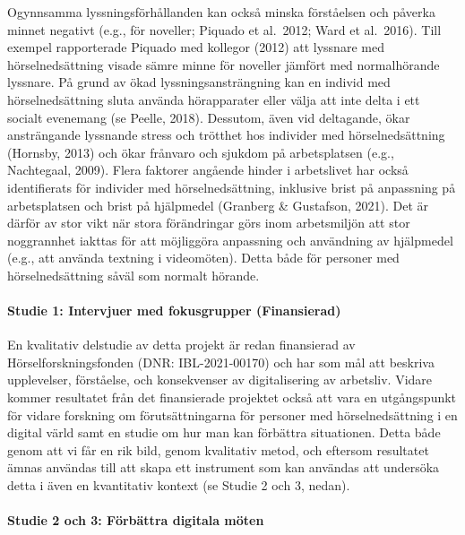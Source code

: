 \documentclass[]{article}
\begin{document}
Ogynnsamma lyssningsförhållanden kan också minska förståelsen och
påverka minnet negativt (e.g., för noveller; Piquado et al.~2012; Ward
et al.~2016). Till exempel rapporterade Piquado med kollegor (2012) att
lyssnare med hörselnedsättning visade sämre minne för noveller jämfört
med normalhörande lyssnare. På grund av ökad lyssningsansträngning kan
en individ med hörselnedsättning sluta använda hörapparater eller välja
att inte delta i ett socialt evenemang (se Peelle, 2018). Dessutom, även
vid deltagande, ökar ansträngande lyssnande stress och trötthet hos
individer med hörselnedsättning (Hornsby, 2013) och ökar frånvaro och
sjukdom på arbetsplatsen (e.g., Nachtegaal, 2009). Flera faktorer
angående hinder i arbetslivet har också identifierats för individer med
hörselnedsättning, inklusive brist på anpassning på arbetsplatsen och
brist på hjälpmedel (Granberg \& Gustafson, 2021). Det är därför av stor
vikt när stora förändringar görs inom arbetsmiljön att stor noggrannhet
iakttas för att möjliggöra anpassning och användning av hjälpmedel
(e.g., att använda textning i videomöten). Detta både för personer med
hörselnedsättning såväl som normalt hörande.

\hypertarget{studie-1-intervjuer-med-fokusgrupper-finansierad}{%
\paragraph{Studie 1: Intervjuer med fokusgrupper
(Finansierad)}\label{studie-1-intervjuer-med-fokusgrupper-finansierad}}

En kvalitativ delstudie av detta projekt är redan finansierad av
Hörselforskningsfonden (DNR: IBL-2021-00170) och har som mål att
beskriva upplevelser, förståelse, och konsekvenser av digitalisering av
arbetsliv. Vidare kommer resultatet från det finansierade projektet
också att vara en utgångspunkt för vidare forskning om förutsättningarna
för personer med hörselnedsättning i en digital värld samt en studie om
hur man kan förbättra situationen. Detta både genom att vi får en rik
bild, genom kvalitativ metod, och eftersom resultatet ämnas användas
till att skapa ett instrument som kan användas att undersöka detta i
även en kvantitativ kontext (se Studie 2 och 3, nedan).

\hypertarget{studie-2-och-3-fuxf6rbuxe4ttra-digitala-muxf6ten}{%
\paragraph{Studie 2 och 3: Förbättra digitala
möten}\label{studie-2-och-3-fuxf6rbuxe4ttra-digitala-muxf6ten}}
\end{document}
